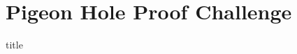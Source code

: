 \documentclass{beamer}
\begin{document}

\section{Pigeon Hole Proof Challenge}
\begin{frame}[plain]
  \vfill \centering
  \begin{beamercolorbox}[sep=8pt,center,shadow=true,rounded=true]{title}
    \insertsectionhead\par%
  \end{beamercolorbox}
  \vfill
\end{frame}
\end{document}
